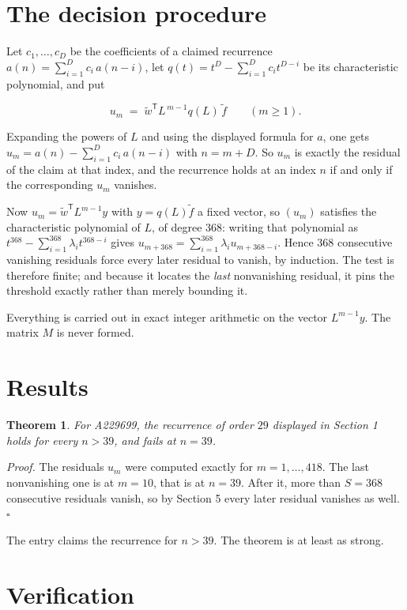 \documentclass[11pt]{article}
\newtheorem{theorem}{Theorem}
\theoremstyle{definition}
\begin{document}
\section{The decision procedure}

Let $c_1,\dots,c_D$ be the coefficients of a claimed recurrence $a(n) = \sum_{i=1}^{D} c_i\,a(n-i)$, let $q(t) = t^{D} - \sum_{i=1}^{D} c_i t^{D-i}$ be its characteristic polynomial, and put

\[u_m \;=\; \tilde w^{\mathsf T} L^{\,m-1} q(L)\,\tilde f \qquad (m \ge 1).\]

Expanding the powers of $L$ and using the displayed formula for $a$, one gets $u_m = a(n) - \sum_{i=1}^{D} c_i\,a(n-i)$ with $n = m + D$. So $u_m$ is exactly the residual of the claim at that index, and the recurrence holds at an index $n$ if and only if the corresponding $u_m$ vanishes.

Now $u_m = \tilde w^{\mathsf T} L^{m-1} y$ with $y = q(L)\tilde f$ a fixed vector, so $(u_m)$ satisfies the characteristic polynomial of $L$, of degree $368$: writing that polynomial as $t^{368} - \sum_{i=1}^{368} \lambda_i t^{368-i}$ gives $u_{m+368} = \sum_{i=1}^{368} \lambda_i u_{m+368-i}$. Hence $368$ consecutive vanishing residuals force every later residual to vanish, by induction. The test is therefore finite; and because it locates the {\itshape last} nonvanishing residual, it pins the threshold exactly rather than merely bounding it.

Everything is carried out in exact integer arithmetic on the vector $L^{m-1}y$. The matrix $M$ is never formed.

\section{Results}

\begin{theorem} For A229699, the recurrence of order $29$ displayed in Section 1 holds for every $n > 39$, and fails at $n = 39$.\end{theorem}

{\itshape Proof.} The residuals $u_m$ were computed exactly for $m = 1,\dots,418$. The last nonvanishing one is at $m = 10$, that is at $n = 39$. After it, more than $S = 368$ consecutive residuals vanish, so by Section 5 every later residual vanishes as well. $\square$

The entry claims the recurrence for $n > 39$. The theorem is at least as strong.

\section{Verification}
\end{document}
